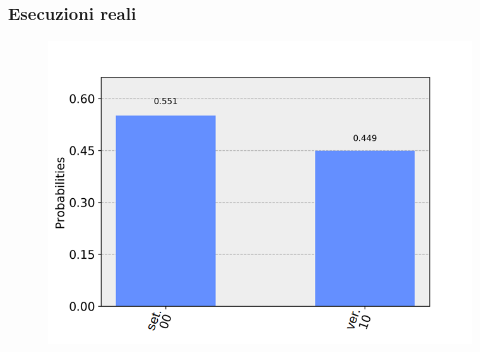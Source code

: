 \documentclass{beamer}
\begin{document}
	\begin{frame}
		\frametitle{Esecuzioni reali}
		\begin{figure}[]
			\centering
			\includegraphics[width=\textwidth]{gfx/misura_setosa_sperimentale}
			\caption{}
			\label{fig:setosa_sperimentale}
		\end{figure}
	\end{frame}
\end{document}
